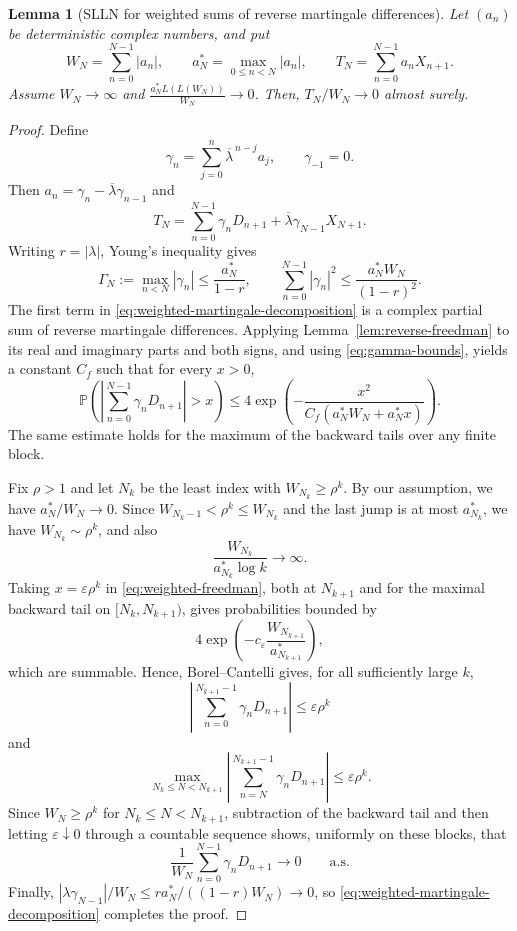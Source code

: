 \documentclass[12pt, reqno, final, a4paper]{amsart}
\theoremstyle{plain}
\newtheorem{lemma}[theorem]{Lemma}
\theoremstyle{definition}
\theoremstyle{remark}
\newcommand{\1}{\mathbf 1}
\begin{document}
\begin{lemma}[SLLN for weighted sums of reverse martingale differences]
\label{lem:SLLNWeighted}
Let $(a_n)$ be deterministic complex numbers, and put
\[
 W_N=\sum_{n=0}^{N-1}|a_n|,
 \qquad a_N^*=\max_{0\le n<N}|a_n|,
 \qquad T_N=\sum_{n=0}^{N-1}a_nX_{n+1}.
\]
Assume $W_N\to\infty$ and $ \frac{a_N^*L(L(W_N))}{W_N}\to0$. Then, $T_N/W_N\to0$ almost surely.
\end{lemma}
\begin{proof}
Define
\[
 \gamma_n=\sum_{j=0}^n\overline\lambda^{\,n-j}a_j,
 \qquad \gamma_{-1}=0.
\]
Then $a_n=\gamma_n-\overline\lambda\gamma_{n-1}$ and
\begin{equation}\label{eq:weighted-martingale-decomposition}
 T_N=\sum_{n=0}^{N-1}\gamma_nD_{n+1}
     +\overline\lambda\gamma_{N-1}X_{N+1}.
\end{equation}
Writing $r=|\lambda|$, Young's inequality gives
\begin{equation}
\label{eq:gamma-bounds}
 \Gamma_N:=\max_{n<N}|\gamma_n|\le\frac{a_N^*}{1-r},
 \qquad
 \sum_{n=0}^{N-1}|\gamma_n|^2
 \le\frac{a_N^*W_N}{(1-r)^2}.
\end{equation}
The first term in \eqref{eq:weighted-martingale-decomposition} is a complex
partial sum of reverse martingale differences. Applying
Lemma~\ref{lem:reverse-freedman} to its real and imaginary parts and both
signs, and using \eqref{eq:gamma-bounds}, yields a constant $C_f$ such that
for every $x>0$,
\begin{equation}\label{eq:weighted-freedman}
 \mathbb P\left(
 \left|\sum_{n=0}^{N-1}\gamma_nD_{n+1}\right|>x\right)
 \le4\exp\left(
 -\frac{x^2}{C_f(a_N^*W_N+a_N^*x)}
 \right).
\end{equation}
The same estimate holds for the maximum of the backward tails over any finite
block.

Fix $\rho>1$ and let $N_k$ be the least index with $W_{N_k}\ge\rho^k$.
By our assumption, we have $a_N^*/W_N\to 0$. Since
$W_{N_k-1}<\rho^k\le W_{N_k}$ and the last jump is at most $a_{N_k}^*$, we have $W_{N_k}\sim\rho^k$, and also
\[
 \frac{W_{N_k}}{a_{N_k}^*\log k}\longrightarrow\infty.
\]
Taking $x=\varepsilon\rho^k$ in \eqref{eq:weighted-freedman}, both at
$N_{k+1}$ and for the maximal backward tail on $[N_k,N_{k+1})$, gives
probabilities bounded by
\[
 4\exp\left(-c_\varepsilon
             \frac{W_{N_{k+1}}}{a_{N_{k+1}}^*}\right),
\]
which are summable. Hence, Borel--Cantelli gives,
for all sufficiently large $k$,
\[
 \left|\sum_{n=0}^{N_{k+1}-1}\gamma_nD_{n+1}\right|
 \le\varepsilon\rho^k
\]
and
\[
 \max_{N_k\le N<N_{k+1}}
 \left|\sum_{n=N}^{N_{k+1}-1}\gamma_nD_{n+1}\right|
 \le\varepsilon\rho^k.
\]
Since $W_N\ge\rho^k$ for $N_k\le N<N_{k+1}$, subtraction of the backward
tail and then letting $\varepsilon\downarrow0$ through a countable sequence
shows, uniformly on these blocks, that
\[
 \frac{1}{W_N}\sum_{n=0}^{N-1}\gamma_nD_{n+1}\longrightarrow0
 \qquad\text{a.s.}
\]
Finally,
$|\lambda\gamma_{N-1}|/W_N\le r a_N^*/((1-r)W_N)\to0$, so
\eqref{eq:weighted-martingale-decomposition} completes the proof.

\end{proof}
\end{document}
